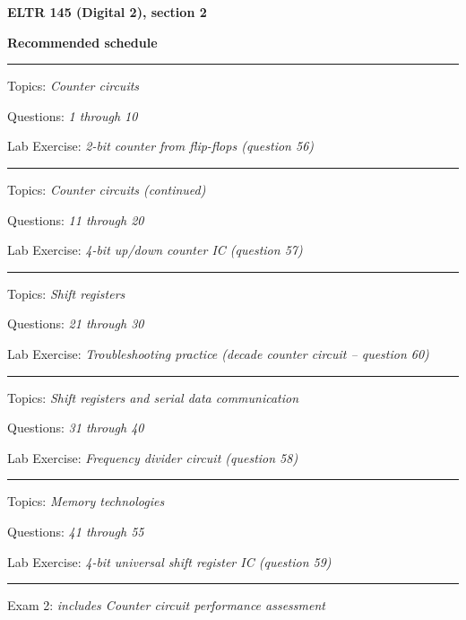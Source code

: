
\centerline{\bf ELTR 145 (Digital 2), section 2} \bigskip 
 
\vskip 10pt

\noindent
{\bf Recommended schedule}

\vskip 5pt

\hrule \vskip 5pt
\noindent
{}

\hskip 10pt Topics: {\it Counter circuits}
 
\hskip 10pt Questions: {\it 1 through 10}
 
\hskip 10pt Lab Exercise: {\it 2-bit counter from flip-flops (question 56)}
 
\vskip 10pt
\hrule \vskip 5pt
\noindent
{}

\hskip 10pt Topics: {\it Counter circuits (continued)}
 
\hskip 10pt Questions: {\it 11 through 20}
 
\hskip 10pt Lab Exercise: {\it 4-bit up/down counter IC (question 57)}
 
\vskip 10pt
\hrule \vskip 5pt
\noindent
{}

\hskip 10pt Topics: {\it Shift registers}
 
\hskip 10pt Questions: {\it 21 through 30}
 
\hskip 10pt Lab Exercise: {\it Troubleshooting practice (decade counter circuit -- question 60)}
 
\vskip 10pt
\hrule \vskip 5pt
\noindent
{}

\hskip 10pt Topics: {\it Shift registers and serial data communication}
 
\hskip 10pt Questions: {\it 31 through 40}
 
\hskip 10pt Lab Exercise: {\it Frequency divider circuit (question 58)}
 
\vskip 10pt
\hrule \vskip 5pt
\noindent
{}

\hskip 10pt Topics: {\it Memory technologies}
 
\hskip 10pt Questions: {\it 41 through 55}
 
\hskip 10pt Lab Exercise: {\it 4-bit universal shift register IC (question 59)}
 

\vskip 10pt
\hrule \vskip 5pt
\noindent
{}

\hskip 10pt Exam 2: {\it includes Counter circuit performance assessment}
 
